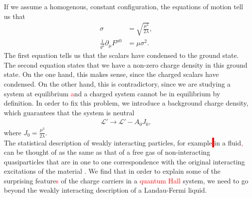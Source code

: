         If we assume a homogenous, constant configuration, the equations of motion tell us that
        \begin{align}
            \sigma &= \sqrt{\frac{\mu^2}{2\lambda}}  \label{eq:chem_pot_local_symmetry_eom1}, \\
            \frac{1}{g^2} \partial_{\mu} F^{\mu 0} &= \mu \sigma^2. \label{eq:chem_pot_local_symmetry_eom2}
        \end{align}
        The first equation tells us that the scalars have condensed to the ground state. The second equation states that we have a non-zero charge density in this ground state. On the one hand, this makes sense, since the charged scalars have condensed. On the other hand, this is contradictory, since we are studying a system at equilibrium \textcolor{red}{a}nd a charged system cannot be in equilibrium by definition. In order to fix this problem, we introduce a background charge density, which guarantees that the system is neutral 
        \begin{align}
            \mathcal{L}' \rightarrow \mathcal{L}' - A_0 J_0,
        \end{align}
        where $J_0 = \frac{\mu^3}{2\lambda}$.\\
        \indent The statistical description of weakly interacting particles, for example\colorbox{red}{ } in a fluid\textcolor{red}{,} can be thought of as the same as that of a free gas of non-interacting quasiparticles that are in one to one correspondence with the original interacting excitations of the material \textcolor{red}{\cite{Landau:1956zuh}}. We find that in order to explain some of the surprising feature\textcolor{red}{s} of the charge carriers in a \textcolor{red}{quantum Hall} system, we need to go beyond the weakly interacting description of a Landau-Fermi liquid.
